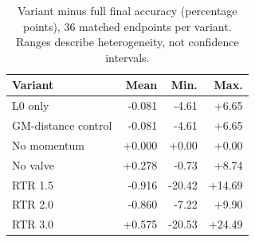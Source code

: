 \begin{table}[!t]
\centering\footnotesize
\caption{Variant minus full final accuracy (percentage points), 36 matched endpoints per variant. Ranges describe heterogeneity, not confidence intervals.}\label{tab:ablation}
\begin{tabular}{lrrr}
\toprule
Variant & Mean & Min. & Max. \\
\midrule
L0 only & -0.081 & -4.61 & +6.65 \\
GM-distance control & -0.081 & -4.61 & +6.65 \\
No momentum & +0.000 & +0.00 & +0.00 \\
No valve & +0.278 & -0.73 & +8.74 \\
RTR 1.5 & -0.916 & -20.42 & +14.69 \\
RTR 2.0 & -0.860 & -7.22 & +9.90 \\
RTR 3.0 & +0.575 & -20.53 & +24.49 \\
\bottomrule
\end{tabular}
\end{table}
